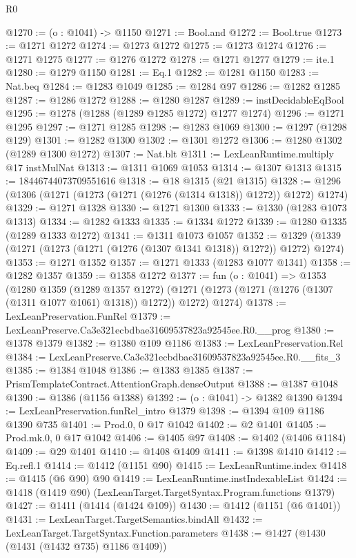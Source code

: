 \begin{lexlean}{R0}
\begin{coremodule}
@1270 := (o : @1041) -> @1150
@1271 := Bool.and
@1272 := Bool.true
@1273 := @1271 @1272
@1274 := @1273 @1272
@1275 := @1273 @1274
@1276 := @1271 @1275
@1277 := @1276 @1272
@1278 := @1271 @1277
@1279 := ite.{1}
@1280 := @1279 @1150
@1281 := Eq.{1}
@1282 := @1281 @1150
@1283 := Nat.beq
@1284 := @1283 @1049
@1285 := @1284 @97
@1286 := @1282 @1285
@1287 := @1286 @1272
@1288 := @1280 @1287
@1289 := instDecidableEqBool
@1295 := @1278 (@1288 (@1289 @1285 @1272) @1277 @1274)
@1296 := @1271 @1295
@1297 := @1271 @1285
@1298 := @1283 @1069
@1300 := @1297 (@1298 @129)
@1301 := @1282 @1300
@1302 := @1301 @1272
@1306 := @1280 @1302 (@1289 @1300 @1272)
@1307 := Nat.blt
@1311 := LexLeanRuntime.multiply @17 instMulNat
@1313 := @1311 @1069 @1053
@1314 := @1307 @1313
@1315 := 18446744073709551616
@1318 := @18 @1315 (@21 @1315)
@1328 := @1296 (@1306 (@1271 (@1273 (@1271 (@1276 (@1314 @1318)) @1272)) @1272) @1274)
@1329 := @1271 @1328
@1330 := @1271 @1300
@1333 := @1330 (@1283 @1073 @1313)
@1334 := @1282 @1333
@1335 := @1334 @1272
@1339 := @1280 @1335 (@1289 @1333 @1272)
@1341 := @1311 @1073 @1057
@1352 := @1329 (@1339 (@1271 (@1273 (@1271 (@1276 (@1307 @1341 @1318)) @1272)) @1272) @1274)
@1353 := @1271 @1352
@1357 := @1271 @1333 (@1283 @1077 @1341)
@1358 := @1282 @1357
@1359 := @1358 @1272
@1377 := fun (o : @1041) =>
  @1353
    (@1280
      @1359
      (@1289 @1357 @1272)
      (@1271 (@1273 (@1271 (@1276 (@1307 (@1311 @1077 @1061) @1318)) @1272)) @1272)
      @1274)
@1378 := LexLeanPreservation.FunRel
@1379 := LexLeanPreserve.Ca3e321ecbdbae31609537823a92545ee.R0.__prog
@1380 := @1378 @1379
@1382 := @1380 @109 @1186
@1383 := LexLeanPreservation.Rel
@1384 := LexLeanPreserve.Ca3e321ecbdbae31609537823a92545ee.R0.__fits_3
@1385 := @1384 @1048
@1386 := @1383 @1385
@1387 := PrismTemplateContract.AttentionGraph.denseOutput
@1388 := @1387 @1048
@1390 := @1386 (@1156 @1388)
@1392 := (o : @1041) -> @1382 @1390
@1394 := LexLeanPreservation.funRel_intro @1379
@1398 := @1394 @109 @1186 @1390 @735
@1401 := Prod.{0, 0} @17 @1042
@1402 := @2 @1401
@1405 := Prod.mk.{0, 0} @17 @1042
@1406 := @1405 @97
@1408 := @1402 (@1406 @1184)
@1409 := @29 @1401
@1410 := @1408 @1409
@1411 := @1398 @1410
@1412 := Eq.refl.{1}
@1414 := @1412 (@1151 @90)
@1415 := LexLeanRuntime.index
@1418 := @1415 (@6 @90) @90
@1419 := LexLeanRuntime.instIndexableList
@1424 := @1418 (@1419 @90) (LexLeanTarget.TargetSyntax.Program.functions @1379)
@1427 := @1411 (@1414 (@1424 @109))
@1430 := @1412 (@1151 (@6 @1401))
@1431 := LexLeanTarget.TargetSemantics.bindAll
@1432 := LexLeanTarget.TargetSyntax.Function.parameters
@1438 := @1427 (@1430 (@1431 (@1432 @735) @1186 @1409))

\end{coremodule}
\end{lexlean}
